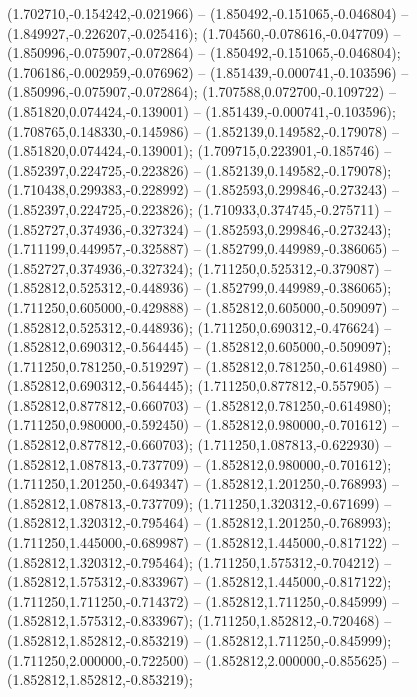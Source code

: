  (1.702710,-0.154242,-0.021966) -- (1.850492,-0.151065,-0.046804) -- (1.849927,-0.226207,-0.025416);
 (1.704560,-0.078616,-0.047709) -- (1.850996,-0.075907,-0.072864) -- (1.850492,-0.151065,-0.046804);
 (1.706186,-0.002959,-0.076962) -- (1.851439,-0.000741,-0.103596) -- (1.850996,-0.075907,-0.072864);
 (1.707588,0.072700,-0.109722) -- (1.851820,0.074424,-0.139001) -- (1.851439,-0.000741,-0.103596);
 (1.708765,0.148330,-0.145986) -- (1.852139,0.149582,-0.179078) -- (1.851820,0.074424,-0.139001);
 (1.709715,0.223901,-0.185746) -- (1.852397,0.224725,-0.223826) -- (1.852139,0.149582,-0.179078);
 (1.710438,0.299383,-0.228992) -- (1.852593,0.299846,-0.273243) -- (1.852397,0.224725,-0.223826);
 (1.710933,0.374745,-0.275711) -- (1.852727,0.374936,-0.327324) -- (1.852593,0.299846,-0.273243);
 (1.711199,0.449957,-0.325887) -- (1.852799,0.449989,-0.386065) -- (1.852727,0.374936,-0.327324);
 (1.711250,0.525312,-0.379087) -- (1.852812,0.525312,-0.448936) -- (1.852799,0.449989,-0.386065);
 (1.711250,0.605000,-0.429888) -- (1.852812,0.605000,-0.509097) -- (1.852812,0.525312,-0.448936);
 (1.711250,0.690312,-0.476624) -- (1.852812,0.690312,-0.564445) -- (1.852812,0.605000,-0.509097);
 (1.711250,0.781250,-0.519297) -- (1.852812,0.781250,-0.614980) -- (1.852812,0.690312,-0.564445);
 (1.711250,0.877812,-0.557905) -- (1.852812,0.877812,-0.660703) -- (1.852812,0.781250,-0.614980);
 (1.711250,0.980000,-0.592450) -- (1.852812,0.980000,-0.701612) -- (1.852812,0.877812,-0.660703);
 (1.711250,1.087813,-0.622930) -- (1.852812,1.087813,-0.737709) -- (1.852812,0.980000,-0.701612);
 (1.711250,1.201250,-0.649347) -- (1.852812,1.201250,-0.768993) -- (1.852812,1.087813,-0.737709);
 (1.711250,1.320312,-0.671699) -- (1.852812,1.320312,-0.795464) -- (1.852812,1.201250,-0.768993);
 (1.711250,1.445000,-0.689987) -- (1.852812,1.445000,-0.817122) -- (1.852812,1.320312,-0.795464);
 (1.711250,1.575312,-0.704212) -- (1.852812,1.575312,-0.833967) -- (1.852812,1.445000,-0.817122);
 (1.711250,1.711250,-0.714372) -- (1.852812,1.711250,-0.845999) -- (1.852812,1.575312,-0.833967);
 (1.711250,1.852812,-0.720468) -- (1.852812,1.852812,-0.853219) -- (1.852812,1.711250,-0.845999);
 (1.711250,2.000000,-0.722500) -- (1.852812,2.000000,-0.855625) -- (1.852812,1.852812,-0.853219);
